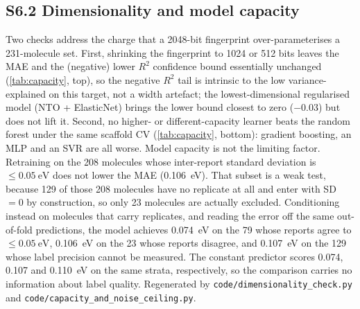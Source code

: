 \documentclass[twoside,twocolumn,9pt]{extarticle}
\begin{document}
\subsection*{S6.2 Dimensionality and model capacity}
Two checks address the charge that a \num{2048}-bit fingerprint over-parameterises a
\num{231}-molecule set. First, shrinking the fingerprint to \num{1024} or \num{512} bits
leaves the MAE and the (negative) lower $R^2$ confidence bound essentially unchanged
(\cref{tab:capacity}, top), so the negative $R^2$ tail is intrinsic to the low
variance-explained on this target, not a width artefact; the lowest-dimensional regularised
model (NTO + ElasticNet) brings the lower bound closest to zero ($-0.03$) but does not lift
it. Second, no higher- or different-capacity learner beats the random forest under the same
scaffold CV (\cref{tab:capacity}, bottom): gradient boosting, an MLP and an SVR are all
worse. Model capacity is not the limiting factor. Retraining on the \num{208} molecules whose
inter-report standard deviation is $\le\qty{0.05}{\electronvolt}$ does not lower the MAE
(\qty{0.106}{\electronvolt}). That subset is a weak test, because \num{129} of those
\num{208} molecules have no replicate at all and enter with SD~$=0$ by construction, so
only \num{23} molecules are actually excluded. Conditioning instead on molecules that
carry replicates, and reading the error off the same out-of-fold predictions, the model
achieves \qty{0.074}{\electronvolt} on the \num{79} whose reports agree to
$\le\qty{0.05}{\electronvolt}$, \qty{0.106}{\electronvolt} on the \num{23} whose
reports disagree, and \qty{0.107}{\electronvolt} on the \num{129} whose label precision
cannot be measured. The constant predictor scores \qty{0.074}{}, \qty{0.107}{} and
\qty{0.110}{\electronvolt} on the same strata, respectively, so the comparison carries
no information about label quality. Regenerated by \texttt{code/dimensionality\_check.py} and
\texttt{code/capacity\_and\_noise\_ceiling.py}.
\end{document}
